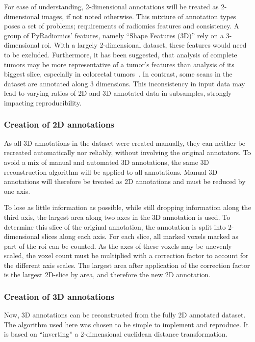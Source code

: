 For ease of understanding, 
2-dimensional annotations will be treated as 2-dimensional images, if not
noted otherwise.
This mixture of annotation types poses a set of problems; requirements of radiomics
features and consistency. A group of PyRadiomics' features, namely 
\enquote{Shape Features (3D)} rely on a 3-dimensional \ac{roi}. With a largely 2-dimensional
dataset, these features would need to be excluded. Furthermore, it has been suggested, 
that analysis of complete tumors may be more representative
of a tumor's features than analysis of its biggest slice, especially in colorectal 
tumors~\cite{whole_tumor_vs_cross_section,rad_in_prec_med}.
In contrast, some scans in the dataset are annotated along 3 dimensions. 
This inconsistency in input data may lead to varying ratios of 2D and 3D 
annotated data in subsamples, strongly impacting reproducibility.

\subsubsection{Creation of 2D annotations}
As all 3D annotations in the dataset were created manually, they can neither
be recreated automatically nor reliably, without involving the original annotators.
To avoid a mix of manual and automated 3D annotations, the same 3D reconstruction 
algorithm will be applied to all annotations.
Manual 3D annotations will therefore be treated as 2D annotations 
and must be reduced by one axis.

To lose as little information as possible, while still dropping information along the third
axis, the largest area along two axes in the 3D annotation is used. To determine this slice
of the original annotation, the annotation is split into 2-dimensional slices along each axis.
For each slice, all marked voxels marked as part of the \ac{roi} can be counted. As the axes of 
these voxels may be unevenly scaled, the voxel count must be multiplied with a correction factor to account for
the different axis scales. The largest area after application of the correction factor is the 
largest 2D-slice by area, and therefore the new 2D annotation.

\subsubsection{Creation of 3D annotations}
Now, 3D annotations can be reconstructed from the fully 2D annotated dataset.
The algorithm used here was chosen to be simple to implement and reproduce.
It is based on \enquote{inverting} a 2-dimensional euclidean distance 
transformation. %


